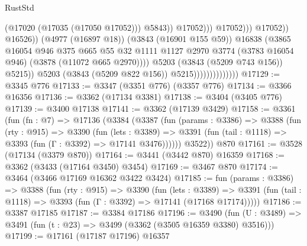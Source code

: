 \begin{lexlean}{RustStd}
\begin{coremodule}
                                                              (@17020 (@17035 (@17050 @17052)))
                                                              @5843))
                                                          @17052)))
                                                    @17052)))
                                              @17052))
                                          @16526))
                                      (@4977 (@16897 @18))
                                      (@3843 (@16901 @155 @59))
                                      @16838
                                      (@3865
                                        @16054
                                        @946
                                        @375
                                        @665
                                        @55
                                        @32
                                        @1111
                                        @1127
                                        @2970
                                        @3774
                                        (@3783 @16054 @946)
                                        (@3878 (@11072 @665 @2970))))
                                    @5203
                                    (@3843 (@5209 @743 @156))
                                    @5215))
                                @5203
                                (@3843 (@5209 @822 @156))
                                @5215))))))))))))))
@17129 := @3345 @776
@17133 := @3347 (@3351 @776) (@3357 @776)
@17134 := @3366 @16356
@17136 := @3362 (@17134 @3381)
@17138 := @3404 (@3405 @776)
@17139 := @3400 @17138
@17141 := @3362 (@17139 @3429)
@17158 := @3361
    (fun (fn : @7) =>
    @17136
      (@3384
        (@3387
          (fun (params : @3386) =>
          @3388
            (fun (rty : @915) =>
            @3390
              (fun (lets : @3389) =>
              @3391 (fun (tail : @1118) => @3393 (fun (Γ : @3392) => @17141 @3476))))))
        @3522))
    @870
@17161 := @3528 (@17134 (@3379 @870))
@17164 := @3441 (@3442 @870) @16359
@17168 := @3362 (@3433 (@17164 @3450) @3454)
@17169 := @3467 @870
@17174 := @3464 (@3466 @17169 @16362 @3422 @3424)
@17185 := fun (params : @3386) =>
  @3388
    (fun (rty : @915) =>
    @3390
      (fun (lets : @3389) =>
      @3391 (fun (tail : @1118) => @3393 (fun (Γ : @3392) => @17141 (@17168 @17174)))))
@17186 := @3387 @17185
@17187 := @3384 @17186
@17196 := @3490
    (fun (U : @3489) => @3491 (fun (t : @23) => @3499 (@3362 (@3505 @16359 @3380) @3516)))
@17199 := @17161 (@17187 @17196) @16357

\end{coremodule}
\end{lexlean}
